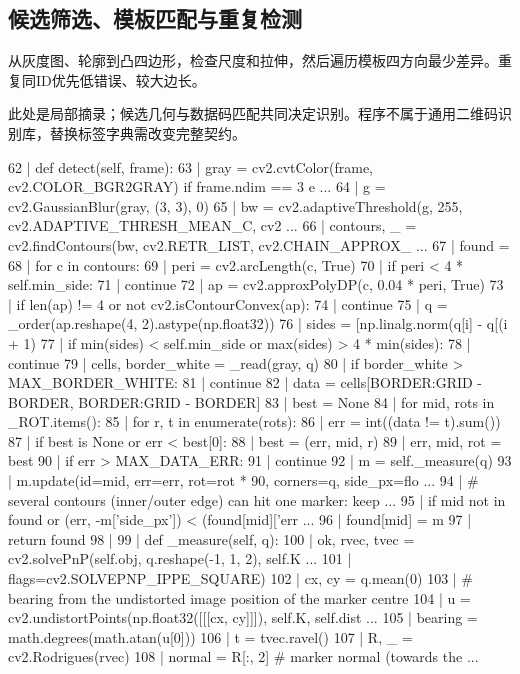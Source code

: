 \subsection{候选筛选、模板匹配与重复检测}
从灰度图、轮廓到凸四边形，检查尺度和拉伸，然后遍历模板四方向最少差异。重复同ID优先低错误、较大边长。

此处是局部摘录；候选几何与数据码匹配共同决定识别。程序不属于通用二维码识别库，替换标签字典需改变完整契约。
\begin{CodeBlock}
  62 |     def detect(self, frame):
  63 |         gray = cv2.cvtColor(frame, cv2.COLOR_BGR2GRAY) if frame.ndim == 3 e ...
  64 |         g = cv2.GaussianBlur(gray, (3, 3), 0)
  65 |         bw = cv2.adaptiveThreshold(g, 255, cv2.ADAPTIVE_THRESH_MEAN_C, cv2  ...
  66 |         contours, _ = cv2.findContours(bw, cv2.RETR_LIST, cv2.CHAIN_APPROX_ ...
  67 |         found = {}
  68 |         for c in contours:
  69 |             peri = cv2.arcLength(c, True)
  70 |             if peri < 4 * self.min_side:
  71 |                 continue
  72 |             ap = cv2.approxPolyDP(c, 0.04 * peri, True)
  73 |             if len(ap) != 4 or not cv2.isContourConvex(ap):
  74 |                 continue
  75 |             q = _order(ap.reshape(4, 2).astype(np.float32))
  76 |             sides = [np.linalg.norm(q[i] - q[(i + 1) %
  77 |             if min(sides) < self.min_side or max(sides) > 4 * min(sides):
  78 |                 continue
  79 |             cells, border_white = _read(gray, q)
  80 |             if border_white > MAX_BORDER_WHITE:
  81 |                 continue
  82 |             data = cells[BORDER:GRID - BORDER, BORDER:GRID - BORDER]
  83 |             best = None
  84 |             for mid, rots in _ROT.items():
  85 |                 for r, t in enumerate(rots):
  86 |                     err = int((data != t).sum())
  87 |                     if best is None or err < best[0]:
  88 |                         best = (err, mid, r)
  89 |             err, mid, rot = best
  90 |             if err > MAX_DATA_ERR:
  91 |                 continue
  92 |             m = self._measure(q)
  93 |             m.update(id=mid, err=err, rot=rot * 90, corners=q, side_px=flo  ...
  94 |             # several contours (inner/outer edge) can hit one marker: keep  ...
  95 |             if mid not in found or (err, -m['side_px']) < (found[mid]['err  ...
  96 |                 found[mid] = m
  97 |         return found
  98 | 
  99 |     def _measure(self, q):
 100 |         ok, rvec, tvec = cv2.solvePnP(self.obj, q.reshape(-1, 1, 2), self.K ...
 101 |                                       flags=cv2.SOLVEPNP_IPPE_SQUARE)
 102 |         cx, cy = q.mean(0)
 103 |         # bearing from the undistorted image position of the marker centre
 104 |         u = cv2.undistortPoints(np.float32([[[cx, cy]]]), self.K, self.dist ...
 105 |         bearing = math.degrees(math.atan(u[0]))
 106 |         t = tvec.ravel()
 107 |         R, _ = cv2.Rodrigues(rvec)
 108 |         normal = R[:, 2]                      # marker normal (towards the  ...
\end{CodeBlock}
